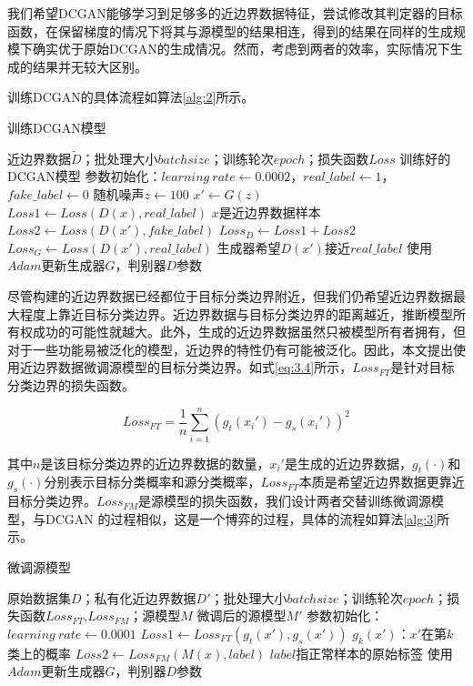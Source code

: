 我们希望DCGAN能够学习到足够多的近边界数据特征，尝试修改其判定器的目标函数，在保留梯度的情况下将其与源模型的结果相连，得到的结果在同样的生成规模下确实优于原始DCGAN的生成情况。然而，考虑到两者的效率，实际情况下生成的结果并无较大区别。

训练DCGAN的具体流程如算法\ref{alg:2}所示。

\begin{algorithm}[!h] 
	\caption{训练DCGAN模型}
	\label{alg:2}
	\begin{algorithmic}[1]
		
		\Require 近边界数据$\tilde{D}$；批处理大小$batchsize$；训练轮次$epoch$；损失函数$Loss$
		\Ensure 训练好的DCGAN模型
		\State 参数初始化：$learning \ rate \gets 0.0002$，$real\_label \gets 1$，$fake\_label \gets 0$
		\State 随机噪声$z \gets 100$ 
		\State $x' \gets G(z)$
		\State $Loss1 \gets Loss(D(x), real\_label)$  \Comment $x$是近边界数据样本
		\State $Loss2 \gets Loss(D(x'), fake\_label)$
		\State $Loss_D \gets Loss1 + Loss2$
		\State $Loss_G \gets Loss(D(x'), real\_label)$ \Comment 生成器希望$D(x') $接近$real\_label$
		\State 使用$Adam$更新生成器$G$，判别器$D$参数
		\EndFor
	\end{algorithmic}
\end{algorithm}

尽管构建的近边界数据已经都位于目标分类边界附近，但我们仍希望近边界数据最大程度上靠近目标分类边界。近边界数据与目标分类边界的距离越近，推断模型所有权成功的可能性就越大。此外，生成的近边界数据虽然只被模型所有者拥有，但对于一些功能易被泛化的模型，近边界的特性仍有可能被泛化。因此，本文提出使用近边界数据微调源模型的目标分类边界。如式\ref{eq:3.4}所示，$Loss_{FT}$是针对目标分类边界的损失函数。

\begin{equation}
	\label{eq:3.10}
	Loss_{FT} = \frac{1}{n} \sum^{n}_{i = 1} (g_t(x_i') - g_s(x_i'))^2
\end{equation}

\noindent 其中$n$是该目标分类边界的近边界数据的数量，$x_i'$是生成的近边界数据，$g_t(\cdot)$和$g_s(\cdot)$分别表示目标分类概率和源分类概率，$Loss_{FT}$本质是希望近边界数据更靠近目标分类边界。$Loss_{FM}$是源模型的损失函数，我们设计两者交替训练微调源模型，与DCGAN 的过程相似，这是一个博弈的过程，具体的流程如算法\ref{alg:3}所示。

\begin{algorithm}[H] 
	\setstretch{1.3}
	\caption{微调源模型}
	\label{alg:3}
	\begin{algorithmic}[1]
		
		\Require 原始数据集$D$；私有化近边界数据$D'$；批处理大小$batchsize$；训练轮次$epoch$；损失函数$Loss_{FT}$,$Loss_{FM}$；源模型$M$
		\Ensure 微调后的源模型$M'$
		\State 参数初始化：$learning \ rate \gets 0.0001$
		\State $Loss1 \gets Loss_{FT}(g_t(x') , g_s(x'))$ \Comment $g_k(x')$：$x'$在第$k$类上的概率
		\State $Loss2 \gets Loss_{FM}(M(x), label)$ \Comment $label$指正常样本的原始标签
		\State 使用$Adam$更新生成器$G$，判别器$D$参数
		\EndFor
	\end{algorithmic}
\end{algorithm}

